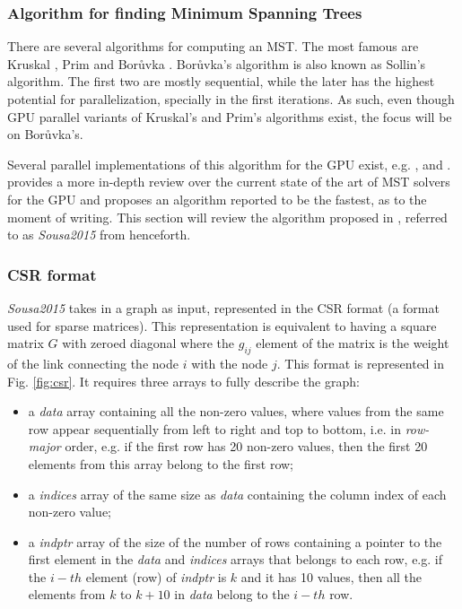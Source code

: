 \subsubsection{Algorithm for finding Minimum Spanning Trees}
There are several algorithms for computing an MST.
The most famous are Kruskal \citep{kruskal1956shortest}, Prim \citep{prim1957shortest} and Borůvka \citep{boruuvka1926jistem}.
Borůvka's algorithm is also known as Sollin's algorithm.
The first two are mostly sequential, while the later has the highest potential for parallelization, specially in the first iterations.
As such, even though GPU parallel variants of Kruskal's \citep{rostrup2013fast} and Prim's \citep{Wang2011} algorithms exist, the focus will be on Borůvka's.%

Several parallel implementations of this algorithm for the GPU exist, e.g. \citep{Vineet2009}, \cite{harish2009large} and \citep{Sousa2015}. \citet{Sousa2015} provides a more in-depth review over the current state of the art of MST solvers for the GPU and proposes an algorithm reported to be the fastest, as to the moment of writing.
This section will review the algorithm proposed in \citep{Sousa2015}, referred to as \emph{Sousa2015} from henceforth.

\subsubsection{CSR format}
\emph{Sousa2015} takes in a graph as input, represented in the CSR format (a format used for sparse matrices).
This representation is equivalent to having a square matrix $G$ with zeroed diagonal where the $g_{ij}$ element of the matrix is the weight of the link connecting the node $i$ with the node $j$.
This format is represented in Fig. \ref{fig:csr}.
It requires three arrays to fully describe the graph:

\begin{itemize}
	\item a \emph{data} array containing all the non-zero values, where values from the same row appear sequentially from left to right and top to bottom, i.e. in \emph{row-major} order, e.g. if the first row has 20 non-zero values, then the first 20 elements from this array belong to the first row;
	\item a \emph{indices} array of the same size as \emph{data} containing the column index of each non-zero value;
	\item a \emph{indptr} array of the size of the number of rows containing a pointer to the first element in the \emph{data} and \emph{indices} arrays that belongs to each row, e.g. if the $i-th$ element (row) of \emph{indptr} is $k$ and it has 10 values, then all the elements from $k$ to $k + 10$ in \emph{data} belong to the $i-th$ row.
\end{itemize}

